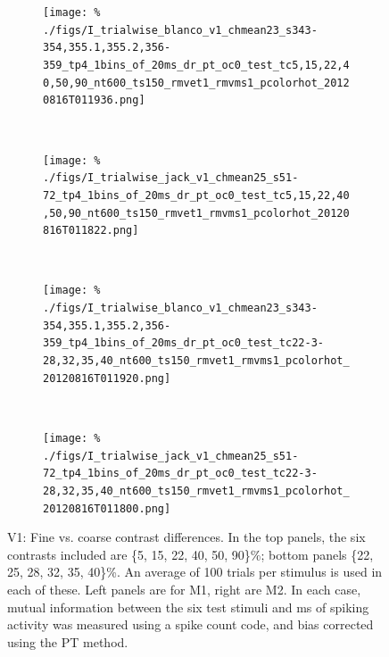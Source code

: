 \begin{figure}[htbp]
    \begin{subfigure}[b]{0.5\linewidth}
        \centering
        \caption{\small{}}
        \label{fig:b1-1x20cc}
        \texttt{[image: \%
./figs/I\_trialwise\_blanco\_v1\_chmean23\_s343-354,355.1,355.2,356-359\_tp4\_1bins\_of\_20ms\_dr\_pt\_oc0\_test\_tc5,15,22,40,50,90\_nt600\_ts150\_rmvet1\_rmvms1\_pcolorhot\_20120816T011936.png]}
    \end{subfigure}
    ~~
    \begin{subfigure}[b]{0.5\linewidth}
        \centering
        \caption{\small{}}
        \label{fig:j1-1x20cc}
        \texttt{[image: \%
./figs/I\_trialwise\_jack\_v1\_chmean25\_s51-72\_tp4\_1bins\_of\_20ms\_dr\_pt\_oc0\_test\_tc5,15,22,40,50,90\_nt600\_ts150\_rmvet1\_rmvms1\_pcolorhot\_20120816T011822.png]}
    \end{subfigure}
    \\
    \begin{subfigure}[b]{0.5\linewidth}
        \centering
        \caption{\small{}}
        \label{fig:b1-1x20fc}
        \texttt{[image: \%
./figs/I\_trialwise\_blanco\_v1\_chmean23\_s343-354,355.1,355.2,356-359\_tp4\_1bins\_of\_20ms\_dr\_pt\_oc0\_test\_tc22-3-28,32,35,40\_nt600\_ts150\_rmvet1\_rmvms1\_pcolorhot\_20120816T011920.png]}
    \end{subfigure}
    ~~
    \begin{subfigure}[b]{0.5\linewidth}
        \centering
        \caption{\small{}}
        \label{fig:j1-1x20fc}
        \texttt{[image: \%
./figs/I\_trialwise\_jack\_v1\_chmean25\_s51-72\_tp4\_1bins\_of\_20ms\_dr\_pt\_oc0\_test\_tc22-3-28,32,35,40\_nt600\_ts150\_rmvet1\_rmvms1\_pcolorhot\_20120816T011800.png]}
    \end{subfigure}
    \caption{\small{}V1: Fine vs. coarse contrast differences.
In the top panels, the six contrasts included are \{5, 15, 22, 40, 50, 90\}\%; bottom panels \{22, 25, 28, 32, 35, 40\}\%. An average of 100 trials per stimulus is used in each of these.
Left panels are for M1, right are M2.
In each case, mutual information between the six test stimuli and \unit[20]{ms} of spiking activity was measured using a spike count code, and bias corrected using the PT method.
}
    \label{fig:v1-fvc}
\end{figure}


